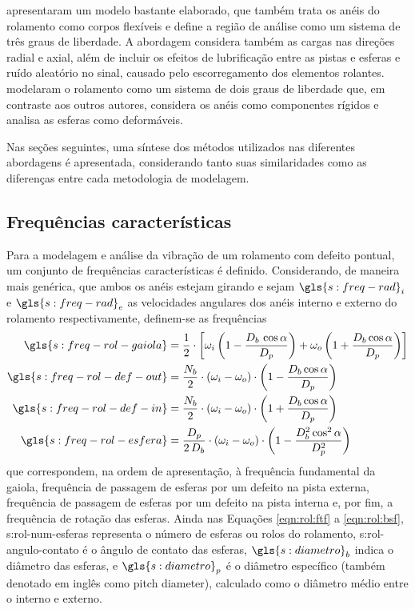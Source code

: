 \documentclass[12pt,openright,oneside,a4paper,
	chapter=TITLE,section=TITLE,
	english,brazil]{abntex2}
\begin{document}
	\citeauthor{sassi:2007} apresentaram um modelo bastante elaborado, que também trata os anéis do rolamento como corpos flexíveis e define a região de análise como um sistema de três graus de liberdade. A abordagem considera também as cargas nas direções radial e axial, além de incluir os efeitos de lubrificação entre as pistas e esferas e ruído aleatório no sinal, causado pelo escorregamento dos elementos rolantes.	\citeauthor{patil:2010} modelaram o rolamento como um sistema de dois graus de liberdade que, em contraste aos outros autores, considera os anéis como componentes rígidos e analisa as esferas como deformáveis.
	
	Nas seções seguintes, uma síntese dos métodos utilizados nas diferentes abordagens é apresentada, considerando tanto suas similaridades como as diferenças entre cada metodologia de modelagem.
	
	\subsection{Frequências características}
	Para a modelagem e análise da vibração de um rolamento com defeito pontual, um conjunto de frequências características é definido. Considerando, de maneira mais genérica, que ambos os anéis estejam girando e sejam $ \gls{s:freq-rad}_i $ e $ \gls{s:freq-rad}_e $ as velocidades angulares dos anéis interno e externo do rolamento respectivamente, definem-se as frequências \cite{sassi:2007}
	\begin{align}
		\gls{s:freq-rol-gaiola} &= \frac{1}{2}\cdot\left[ \omega_i\left(1-\frac{D_b\,\cos\alpha}{D_p} \right) + \omega_o\left(1+\frac{D_b\cos\alpha}{D_p} \right) \right] \label{eqn:rol:ftf}\\
		\gls{s:freq-rol-def-out} &= \frac{N_b}{2}\cdot(\omega_i-\omega_o)\cdot\left(1-\frac{D_b\cos\alpha}{D_p} \right) \label{eqn:rol:bpfo}\\
		\gls{s:freq-rol-def-in} &= \frac{N_b}{2}\cdot(\omega_i-\omega_o)\cdot\left(1+\frac{D_b\cos\alpha}{D_p} \right) \label{eqn:rol:bpfi}\\
		\gls{s:freq-rol-esfera} &= \frac{D_p}{2\,D_b}\cdot(\omega_i-\omega_o)\cdot\left(1-\frac{D_b^2\cos^2\alpha}{D_p^2} \right) \label{eqn:rol:bsf}
	\end{align}
	que correspondem, na ordem de apresentação, à frequência fundamental da gaiola, frequência de passagem de esferas por um defeito na pista externa, frequência de passagem de esferas por um defeito na pista interna e, por fim, a frequência de rotação das esferas. Ainda nas Equações \ref{eqn:rol:ftf} a \ref{eqn:rol:bsf}, \gls{s:rol-num-esferas} representa o número de esferas ou rolos do rolamento, \gls{s:rol-angulo-contato} é o ângulo de contato das esferas, $ \gls{s:diametro}_b $ indica o diâmetro das esferas, e $ \gls{s:diametro}_p $ é o diâmetro específico (também denotado em inglês como \foreignlanguage{english}{pitch diameter}), calculado como o diâmetro médio entre o interno e externo.
\end{document}
